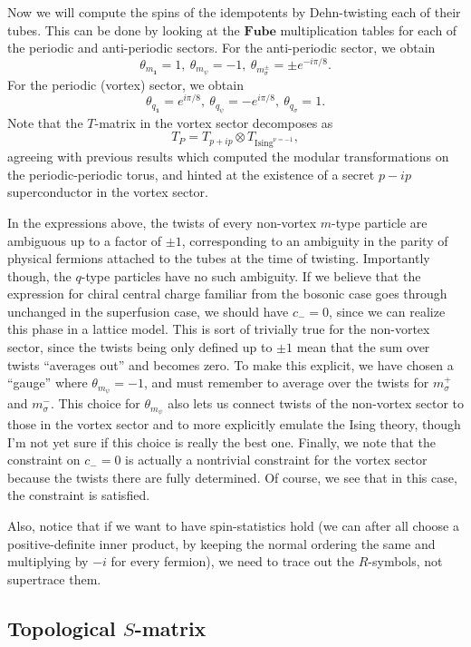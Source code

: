 \documentclass[12pt,a4paper]{article}
\newcommand{\tp}{\otimes}
\newcommand{\unit}{\mathbf{1}}
\newcommand\be            {\begin{equation}}
\newcommand\ee            {\end{equation}}
\newcommand{\fube}{\textbf{Fube}}
\begin{document}
{{Now we will compute the spins of the idempotents by Dehn-twisting each of their tubes. This can be done by looking at the $\fube$ multiplication tables for each of the periodic and anti-periodic sectors. 
For the anti-periodic sector, we obtain 
\be \theta_{m_\unit} = 1,\ \theta_{m_\psi} = -1,\ \theta_{m^\pm_\sigma} = \pm e^{-i\pi/8}.\ee
For the periodic (vortex) sector, we obtain 
\be \theta_{q_\unit} = e^{i\pi/8},\ \theta_{q_\psi} = -e^{i\pi/8},\ \theta_{q_\sigma} = 1.\ee
Note that the $T$-matrix in the vortex sector decomposes as 
\be T_P = T_{p+ip} \tp T_{\text{Ising}^{\nu = -1}},\ee
agreeing with previous results which computed the modular transformations on the periodic-periodic torus, and hinted at the existence of a secret $p-ip$ superconductor in the vortex sector. 

In the expressions above, the twists of every non-vortex $m$-type particle are ambiguous up to a factor of $\pm1$, corresponding to an ambiguity in the parity of physical fermions attached to the tubes at the time of twisting. Importantly though, the $q$-type particles have no such ambiguity.  
If we believe that the expression for chiral central charge familiar from the bosonic case goes through unchanged in the superfusion case, we should have $c_-=0$, since we can realize this phase in a lattice model. This is sort of trivially true for the non-vortex sector, since the twists being only defined up to $\pm1$ mean that the sum over twists ``averages out'' and becomes zero. To make this explicit, we have chosen a ``gauge'' where $\theta_{m_\psi}=-1$, and must remember to  average over the twists for $m_\sigma^+$ and $m_\sigma^-$. This choice for $\theta_{m_\psi}$ also lets us connect twists of the non-vortex sector to those in the vortex sector and to more explicitly emulate the Ising theory, though I'm not yet sure if this choice is really the best one. Finally, we note that the constraint on $c_-=0$ is actually a nontrivial constraint for the vortex sector because the twists there are fully determined. Of course, we see that in this case, the constraint is satisfied. 

Also, notice that if we want to have spin-statistics hold (we can after all choose a positive-definite inner product, by keeping the normal ordering the same and multiplying by $-i$ for every fermion), we need to trace out the $R$-symbols, not supertrace them.


\subsection{Topological $S$-matrix}
}}
\end{document}
